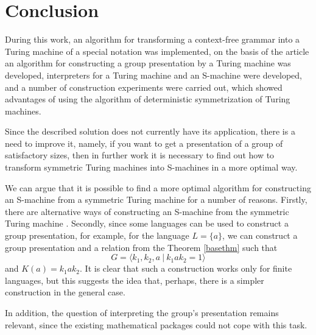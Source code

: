 \documentclass[conference]{IEEEtran}
\theoremstyle{definition}
\begin{document}
\section{Conclusion}

During this work, an algorithm for transforming a context-free grammar into a Turing machine of a special notation was implemented, on the basis of the article \cite{Sapir} an algorithm for constructing a group presentation by a Turing machine was developed, interpreters for a Turing machine and an S-machine were developed, and a number of construction experiments were carried out, which showed advantages of using the algorithm of deterministic symmetrization of Turing machines.

Since the described solution does not currently have its application, there is a need to improve it, namely, if you want to get a presentation of a group of satisfactory sizes, then in further work it is necessary to find out how to transform symmetric Turing machines into S-machines in a more optimal way.

We can argue that it is possible to find a more optimal algorithm for constructing an S-machine from a symmetric Turing machine for a number of reasons.
Firstly, there are alternative ways of constructing an S-machine from the symmetric Turing machine \cite{SpaceFunc}.
Secondly, since some languages can be used to construct a group presentation, for example, for the language $ L = \{a\} $, we can construct a group presentation and a relation from the Theorem \ref{basethm} such that
$$ G = \langle k_1, k_2, a ~|~ k_1 a k_2 = 1 \rangle $$
and $ K (a) = k_1 a k_2 $. It is clear that such a construction works only for finite languages, but this suggests the idea that, perhaps, there is a simpler construction in the general case.

In addition, the question of interpreting the group's presentation remains relevant, since the existing mathematical packages could not cope with this task.
\end{document}
